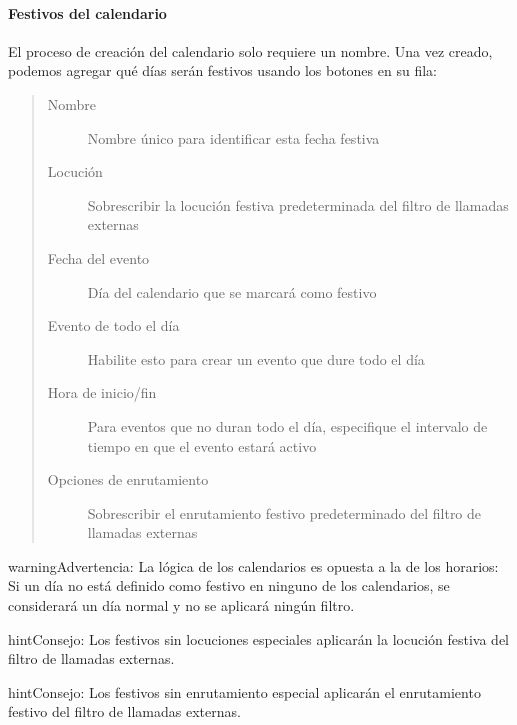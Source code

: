 \documentclass[letterpaper,10pt,spanish]{sphinxmanual}
\begin{document}
\paragraph{Festivos del calendario}
\label{administration_portal/client/vpbx/routing_tools/calendars:calendar-holidays}
El proceso de creación del calendario solo requiere un nombre. Una vez creado, podemos agregar qué días serán festivos usando los botones en su fila:
\begin{quote}
\begin{description}
\item[{Nombre}] \leavevmode
Nombre único para identificar esta fecha festiva

\item[{Locución}] \leavevmode
Sobrescribir la locución festiva predeterminada del filtro de llamadas externas

\item[{Fecha del evento}] \leavevmode
Día del calendario que se marcará como festivo

\item[{Evento de todo el día}] \leavevmode
Habilite esto para crear un evento que dure todo el día

\item[{Hora de inicio/fin}] \leavevmode
Para eventos que no duran todo el día, especifique el intervalo de tiempo en que el evento estará activo

\item[{Opciones de enrutamiento}] \leavevmode
Sobrescribir el enrutamiento festivo predeterminado del filtro de llamadas externas

\end{description}
\end{quote}

\begin{notice}{warning}{Advertencia:}
La lógica de los calendarios es opuesta a la de los horarios: Si un día no está definido como festivo en ninguno de los calendarios, se considerará un día normal y no se aplicará ningún filtro.
\end{notice}

\begin{notice}{hint}{Consejo:}
Los festivos sin locuciones especiales aplicarán la locución festiva del filtro de llamadas externas.
\end{notice}

\begin{notice}{hint}{Consejo:}
Los festivos sin enrutamiento especial aplicarán el enrutamiento festivo del filtro de llamadas externas.
\end{notice}
\end{document}
